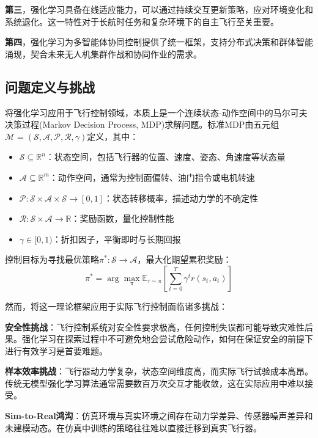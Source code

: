 \documentclass[12pt,a4paper]{ctexart}
\begin{document}
\textbf{第三}，强化学习具备在线适应能力，可以通过持续交互更新策略，应对环境变化和系统退化。这一特性对于长航时任务和复杂环境下的自主飞行至关重要。

\textbf{第四}，强化学习为多智能体协同控制提供了统一框架，支持分布式决策和群体智能涌现，契合未来无人机集群作战和协同作业的需求。

\subsection{问题定义与挑战}

将强化学习应用于飞行控制领域，本质上是一个连续状态-动作空间中的马尔可夫决策过程(Markov Decision Process, MDP)求解问题。标准MDP由五元组$\mathcal{M} = (\mathcal{S}, \mathcal{A}, \mathcal{P}, \mathcal{R}, \gamma)$定义，其中：

\begin{itemize}
    \item $\mathcal{S} \subseteq \mathbb{R}^n$：状态空间，包括飞行器的位置、速度、姿态、角速度等状态量
    \item $\mathcal{A} \subseteq \mathbb{R}^m$：动作空间，通常为控制面偏转、油门指令或电机转速
    \item $\mathcal{P}: \mathcal{S} \times \mathcal{A} \times \mathcal{S} \rightarrow [0,1]$：状态转移概率，描述动力学的不确定性
    \item $\mathcal{R}: \mathcal{S} \times \mathcal{A} \rightarrow \mathbb{R}$：奖励函数，量化控制性能
    \item $\gamma \in [0,1)$：折扣因子，平衡即时与长期回报
\end{itemize}

控制目标为寻找最优策略$\pi^*: \mathcal{S} \rightarrow \mathcal{A}$，最大化期望累积奖励：
\begin{equation}
    \pi^* = \arg\max_{\pi} \mathbb{E}_{\tau \sim \pi}\left[\sum_{t=0}^{T} \gamma^t r(s_t, a_t)\right]
\end{equation}

然而，将这一理论框架应用于实际飞行控制面临诸多挑战：

\textbf{安全性挑战}：飞行控制系统对安全性要求极高，任何控制失误都可能导致灾难性后果。强化学习在探索过程中不可避免地会尝试危险动作，如何在保证安全的前提下进行有效学习是首要难题。

\textbf{样本效率挑战}：飞行器动力学复杂，状态空间维度高，而实际飞行试验成本高昂。传统无模型强化学习算法通常需要数百万次交互才能收敛，这在实际应用中难以接受。

\textbf{Sim-to-Real鸿沟}：仿真环境与真实环境之间存在动力学差异、传感器噪声差异和未建模动态。在仿真中训练的策略往往难以直接迁移到真实飞行器。
\end{document}
